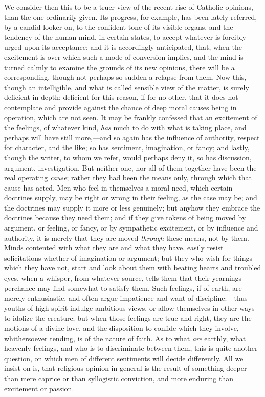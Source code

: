 We consider then this to be a truer view of the
recent rise of Catholic opinions, than the one ordinarily given. Its
progress, for example, has been lately referred, by a candid
looker-on, to the confident tone of its visible organs, and the
tendency of the human mind, in certain states, to accept whatever is
forcibly urged upon its acceptance; and it is accordingly anticipated,
that, when the excitement is over which such a mode of conversion
implies, and the mind is turned calmly to examine the grounds of its
new opinions, there will be a corresponding, though not perhaps so
sudden a relapse from them. Now this, though an intelligible, and what
is called sensible view of the matter, is surely deficient in depth;
deficient for this reason, if for no other, that it does not
contemplate and provide against the chance of deep moral causes being
in operation, which are not seen. It may be frankly confessed that an
excitement of the feelings, of whatever kind, \emph{has} much to do
with what is taking place, and perhaps will have still more,—and so
again has the influence of authority, respect for character, and the
like; so has sentiment, imagination, or fancy; and lastly, though the
writer, to whom we refer, would perhaps deny it, so has discussion,
argument, investigation. But neither one, nor all of them together
have been the real operating \emph{cause}; rather they had been the
means only, through which that cause has acted. Men who feel in
themselves a moral need, which certain doctrines supply, may be right
or wrong in their feeling, as the case may be; and the doctrines
may supply it more or less genuinely; but anyhow they embrace the
doctrines because they need them; and if they give tokens of being
moved by argument, or feeling, or fancy, or by sympathetic excitement,
or by influence and authority, it is merely that they are moved \emph{through}
these means, not by them. Minds contented with what they are and what
they have, easily resist solicitations whether of imagination or
argument; but they who wish for things which they have not, start and
look about them with beating hearts and troubled eyes, when a whisper,
from whatever source, tells them that their yearnings perchance may
find somewhat to satisfy them. Such feelings, if of earth, are merely
enthusiastic, and often argue impatience and want of
discipline:—thus youths of high spirit indulge ambitious views, or
allow themselves in other ways to idolize the creature; but when those
feelings are true and right, they are the motions of a divine love,
and the disposition to confide which they involve, whithersoever
tending, is of the nature of faith. As to what \emph{are} earthly,
what heavenly feelings, and who is to discriminate between them, this
is quite another question, on which men of different sentiments will
decide differently. All we insist on is, that religious opinion in
general is the result of something deeper than mere caprice or than
syllogistic conviction, and more enduring than excitement or passion.

